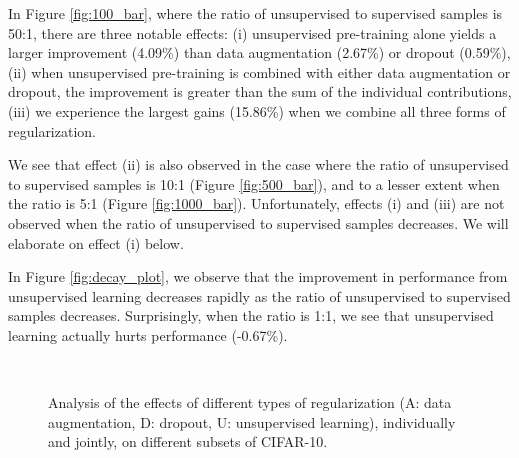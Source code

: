 \documentclass{article} \usepackage{iclr2015,times}
\begin{document}
In Figure \ref{fig:100_bar}, where the ratio of unsupervised to supervised samples is 50:1, there are three notable effects: (i) unsupervised pre-training alone yields a larger improvement (4.09\%) than data augmentation (2.67\%) or dropout (0.59\%), (ii) when unsupervised pre-training is combined with either data augmentation or dropout, the improvement is greater than the sum of the individual contributions, (iii) we experience the largest gains (15.86\%) when we combine all three forms of regularization.

We see that effect (ii) is also observed in the case where the ratio of unsupervised to supervised samples is 10:1 (Figure \ref{fig:500_bar}), and to a lesser extent when the ratio is 5:1 (Figure \ref{fig:1000_bar}). Unfortunately, effects (i) and (iii) are not observed when the ratio of unsupervised to supervised samples decreases. We will elaborate on effect (i) below.

In Figure \ref{fig:decay_plot}, we observe that the improvement in performance from unsupervised learning decreases rapidly as the ratio of unsupervised to supervised samples decreases. Surprisingly, when the ratio is 1:1, we see that unsupervised learning actually hurts performance (-0.67\%).

\begin{figure}[t]
\centering
{}
\\
\caption{Analysis of the effects of different types of regularization (A: data augmentation, D: dropout, U: unsupervised learning), individually and jointly, on different subsets of CIFAR-10.}
\label{fig:improvement_bar}
\vspace{-0.5cm}
\end{figure}
\end{document}
